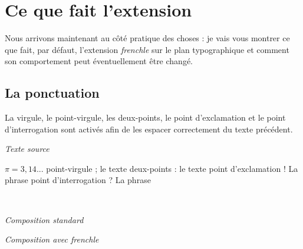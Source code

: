 \documentclass[a4paper,12pt,openright]{article}
\begin{document}
\section{ Ce que fait l’extension}
Nous arrivons maintenant au côté pratique des choses : je vais vous montrer
ce que fait, par défaut, l’extension \textit{frenchle} sur le plan typographique et
comment son comportement peut éventuellement être changé.
\subsection{ La ponctuation}
La virgule, le point-virgule, les deux-points, le point d’exclamation et le
point d’interrogation sont activés afin de les espacer correctement du texte
précédent.
\begin{minipage}{\textwidth}
\begin{center}
\textit{Texte source}\\[0.5ex]
\begin{boxedverbatim}
$\pi=3,14...$
point-virgule ; le texte
deux-points : le texte
point d’exclamation ! La phrase
point d’interrogation ? La phrase

\end{boxedverbatim}
\\[.5ex]
\begin{minipage}{60mm}
\begin{center}
\textit{Composition standard}
\end{center}
\end{minipage}
\begin{minipage}{60mm}
\begin{center}
\textit{Composition avec frenchle}
\end{center}
\end{minipage}
\end{center}
\end{minipage}
\rule{0pt}{1em}
\end{document}

